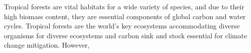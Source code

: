 




Tropical forests are vital habitats for a wide variety of species, and due to their high biomass content, they are essential components of global carbon and water cycles.
Tropical forests are the world's key ecosystems accommodating diverse organisms for diverse ecosystems and carbon sink and stock essential for climate change mitigation. However, 

